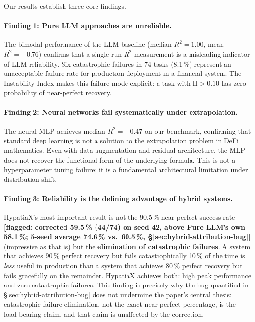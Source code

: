 \documentclass[twoside,11pt]{article}
\newcommand{\Rsq}{R^{2}}
\newcommand{\II}{\mathrm{II}}
\begin{document}
Our results establish three core findings.

\paragraph{Finding 1: Pure LLM approaches are unreliable.}
The bimodal performance of the LLM baseline (median $\Rsq=1.00$, mean $\Rsq=-0.76$)
confirms that a single-run $\Rsq$ measurement is a misleading indicator of LLM
reliability.  Six catastrophic failures in 74 tasks (8.1\,\%) represent an
unacceptable failure rate for production deployment in a financial system.  The
Instability Index makes this failure mode explicit: a task with $\II>0.10$ has
zero probability of near-perfect recovery.

\paragraph{Finding 2: Neural networks fail systematically under extrapolation.}
The neural MLP achieves median $\Rsq=-0.47$ on our benchmark, confirming that
standard deep learning is not a solution to the extrapolation problem in DeFi
mathematics.  Even with data augmentation and residual architecture, the MLP does
not recover the functional form of the underlying formula.  This is not a
hyperparameter tuning failure; it is a fundamental architectural limitation under
distribution shift.

\paragraph{Finding 3: Reliability is the defining advantage of hybrid systems.}
HypatiaX's most important result is not the 90.5\,\% near-perfect success rate
\textbf{[flagged: corrected 59.5\,\% (44/74) on seed 42, above Pure LLM's
own 58.1\,\%; 5-seed average 74.6\,\% vs.\ 60.5\,\%,
\S\ref{sec:hybrid-attribution-bug}]}
(impressive as that is) but the \textbf{elimination of catastrophic failures}.
A system that achieves 90\,\% perfect recovery but fails catastrophically 10\,\%
of the time is \emph{less} useful in production than a system that achieves 80\,\%
perfect recovery but fails gracefully on the remainder.  HypatiaX achieves both:
high peak performance and zero catastrophic failures. This finding is precisely
why the bug quantified in \S\ref{sec:hybrid-attribution-bug} does not undermine
the paper's central thesis: catastrophic-failure elimination, not the exact
near-perfect percentage, is the load-bearing claim, and that claim is
unaffected by the correction.
\end{document}
